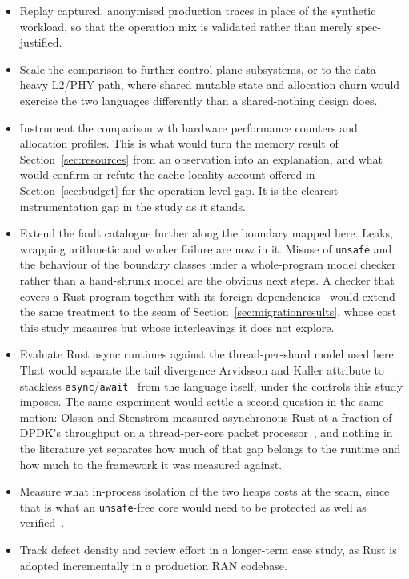 \documentclass[english,twoside,openright,a4paper,censored,csm,software-track-2020]{HYthesisML}
\begin{document}
\begin{itemize}
\item Replay captured, anonymised production traces in place of the synthetic workload, so that
  the operation mix is validated rather than merely spec-justified.
\item Scale the comparison to further control-plane subsystems, or to the data-heavy L2/PHY
  path, where shared mutable state and allocation churn would exercise the two languages
  differently than a shared-nothing design does.
\item Instrument the comparison with hardware performance counters and allocation profiles. This
  is what would turn the memory result of Section~\ref{sec:resources} from an observation into
  an explanation, and what would confirm or refute the cache-locality account offered in
  Section~\ref{sec:budget} for the operation-level gap. It is the clearest instrumentation gap
  in the study as it stands.
\item Extend the fault catalogue further along the boundary mapped here. Leaks, wrapping
  arithmetic and worker failure are now in it. Misuse of \texttt{unsafe} and the behaviour of
  the boundary classes under a whole-program model checker rather than a hand-shrunk model are
  the obvious next steps. A checker that covers a Rust program together with its foreign
  dependencies~\cite{pearce2026rustmc} would extend the same treatment to the seam of
  Section~\ref{sec:migrationresults}, whose cost this study measures but whose interleavings it
  does not explore.
\item Evaluate Rust async runtimes against the thread-per-shard model used here. That would
  separate the tail divergence Arvidsson and Kaller attribute to stackless
  \texttt{async}/\texttt{await}~\cite{arvidsson2025async} from the language itself, under the
  controls this study imposes. The same experiment would settle a second question in the same
  motion: Olsson and Stenstr\"om measured asynchronous Rust at a fraction of DPDK's throughput on
  a thread-per-core packet processor~\cite{olsson2023asyncpackets}, and nothing in the literature
  yet separates how much of that gap belongs to the runtime and how much to the framework it was
  measured against.
\item Measure what in-process isolation of the two heaps costs at the seam, since that is what
  an \texttt{unsafe}-free core would need to be protected as well as
  verified~\cite{rivera2021galeed,kirth2022pkrusafe}.
\item Track defect density and review effort in a longer-term case study, as Rust is adopted
  incrementally in a production RAN codebase.
\end{itemize}
\end{document}
